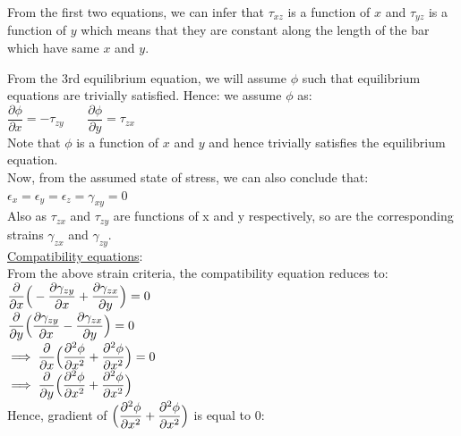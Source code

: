 \documentclass{article}
\begin{document}
\noindent From the first two equations, we can infer that $\tau_{xz}$ is a function of $x$ and $\tau_{yz}$ is a function of $y$ which means that they are constant along the length of the bar which have same $x$ and $y$. 

\noindent From the 3rd equilibrium equation, we will assume $\phi$ such that equilibrium equations are trivially satisfied. Hence: we assume $\phi$ as: \\

\noindent $\dfrac{\partial \phi}{\partial x}= -\tau_{zy}$ \ \ \ $\dfrac{\partial \phi}{\partial y}= \tau_{zx}$\\

\noindent Note that $\phi$ is a function of $x$ and $y$ and hence trivially satisfies the equilibrium equation. \\

\noindent Now, from the assumed state of stress, we can also conclude that: \\
$\epsilon_x= \epsilon_y = \epsilon_z= \gamma_{xy}=0$\\
Also as $\tau_{zx}$ and $\tau_{zy}$ are functions of x and y respectively, so are the corresponding strains $\gamma_{zx}$ and $\gamma_{zy}$.\\

\noindent \underline{Compatibility equations}: \\

\noindent From the above strain criteria, the compatibility equation reduces to: \\

\noindent $\dfrac{\partial}{\partial x} \Big{(}-\dfrac{\partial \gamma_{zy}}{\partial x}+\dfrac{\partial \gamma_{zx}}{\partial y}\Big{)}=0$\\
$\dfrac{\partial}{\partial y} \Big{(}\dfrac{\partial \gamma_{zy}}{\partial x}-\dfrac{\partial \gamma_{zx}}{\partial y}\Big{)}=0$\\

\noindent $\implies \dfrac{\partial}{\partial x}\Big{(}\dfrac{\partial^2 \phi}{\partial x^2}+\dfrac{\partial^2 \phi}{\partial x^2} \Big{)}=0$\\

\noindent $\implies \dfrac{\partial}{\partial y}\Big{(}\dfrac{\partial^2 \phi}{\partial x^2}+\dfrac{\partial^2 \phi}{\partial x^2} \Big{)}$\\

\noindent Hence, gradient of $\Big{(}\dfrac{\partial^2 \phi}{\partial x^2}+\dfrac{\partial^2 \phi}{\partial x^2} \Big{)}$ is equal to 0: \\
\end{document}
